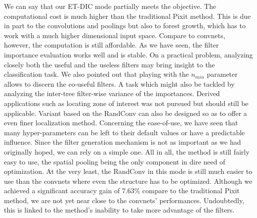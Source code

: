 \documentclass[a4paper]{report}
\begin{document}
We can say that our ET-DIC mode partially meets the objective. The computational cost is much higher than the traditional Pixit method. This is due in part to the convolutions and poolings but also to forest growth, which has to work with a much higher dimensional input space. Compare to convnets, however, the computation is still affordable. As we have seen, the filter importance evaluation works well and is stable. On a practical problem, analyzing closely both the useful and the useless filters may bring insight to the classification task. We also pointed out that playing with the $n_{min}$ parameter allows to discern the co-useful filters. A task which might also be tackled by analyzing the inter-tree filter-wise variance of the importances. Derived applications such as locating zone of interest was not pursued but should still be applicable. Variant based on the RandConv can also be designed so as to offer a even finer localization method. Concerning the ease-of-use, we have seen that many hyper-parameters can be left to their default values or have a predictable influence. Since the filter generation mechanism is not as important as we had originally hoped, we can rely on a simple one. All in all, the method is still fairly easy to use, the spatial pooling being the only component in dire need of optimization. At the very least, the RandConv in this mode is still much easier to use than the convnets where even the structure has to be optimized. Although we achieved a significant accuracy gain of 7.63\% compare to the traditional Pixit method, we are not yet near close to the convnets' performances. Undoubtedly, this is linked to the method's inability to take more advantage of the filters. 
\end{document}
